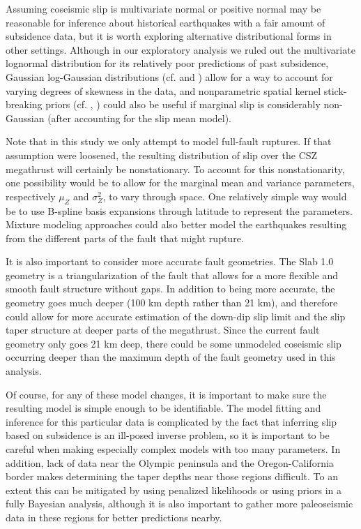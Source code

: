 {Assuming coseismic slip is multivariate normal or positive normal may be reasonable for inference about historical earthquakes with a fair amount of subsidence data, but it is worth exploring alternative distributional forms in other settings.  Although in our exploratory analysis we ruled out the multivariate lognormal distribution for its relatively poor predictions of past subsidence, Gaussian log-Gaussian distributions (cf. \citep{palacios2006non} and \citep[p.150]{handbook}) allow for a way to account for varying degrees of skewness in the data, and nonparametric spatial kernel stick-breaking priors (cf. \citep{stickBreaking}, \citep[p. 160]{handbook}) could also be useful if marginal slip is considerably non-Gaussian (after accounting for the slip mean model).

Note that in this study we only attempt to model full-fault ruptures.  If that assumption were loosened, the resulting distribution of slip over the CSZ megathrust will certainly be nonstationary.  To account for this nonstationarity, one possibility would be to allow for the marginal mean and variance parameters, respectively $\mu_Z$ and $\sigma_Z^2$, to vary through space.  One relatively simple way would be to use B-spline basis expansions through latitude to represent the parameters.  Mixture modeling approaches could also better model the earthquakes resulting from the different parts of the fault that might rupture.

It is also important to consider more accurate fault geometries.  The Slab 1.0 geometry \citep{slabGeom} is a triangularization of the fault that allows for a more flexible and smooth fault structure without gaps.  In addition to being more accurate, the geometry goes much deeper (100 km depth rather than 21 km), and therefore could allow for more accurate estimation of the down-dip slip limit and the slip taper structure at deeper parts of the megathrust.  Since the current fault geometry only goes 21 km deep, there could be some unmodeled coseismic slip occurring deeper than the maximum depth of the fault geometry used in this analysis.

Of course, for any of these model changes, it is important to make sure the resulting model is simple enough to be identifiable.  The model fitting and inference for this particular data is complicated by the fact that inferring slip based on subsidence is an ill-posed inverse problem, so it is important to be careful when making especially complex models with too many parameters.  In addition, lack of data near the Olympic peninsula and the Oregon-California border makes determining the taper depths near those regions difficult.  To an extent this can be mitigated by using penalized likelihoods or using priors in a fully Bayesian analysis, although it is also important to gather more paleoseismic data in these regions for better predictions nearby.

}

